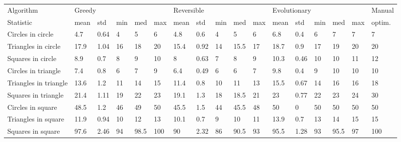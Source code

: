 \begin{tabular}{lllllllllllllllll}
\toprule
Algorithm & \multicolumn{5}{l}{Greedy} & \multicolumn{5}{l}{Reversible} & \multicolumn{5}{l}{Evolutionary} & Manual \\
Statistic &   mean &   std & min &   med &  max &       mean &   std & min &   med & max &         mean &   std & min &   med & max & optim. \\
\midrule
Circles in circle     &    4.7 &  0.64 &   4 &     5 &    6 &        4.8 &   0.6 &   4 &     5 &   6 &          6.8 &   0.4 &   6 &     7 &   7 &      7 \\
Triangles in circle   &   17.9 &  1.04 &  16 &    18 &   20 &       15.4 &  0.92 &  14 &  15.5 &  17 &         18.7 &   0.9 &  17 &    19 &  20 &     20 \\
Squares in circle     &    8.9 &   0.7 &   8 &     9 &   10 &          8 &  0.63 &   7 &     8 &   9 &         10.3 &  0.46 &  10 &    10 &  11 &     12 \\
Circles in triangle   &    7.4 &   0.8 &   6 &     7 &    9 &        6.4 &  0.49 &   6 &     6 &   7 &          9.8 &   0.4 &   9 &    10 &  10 &     10 \\
Triangles in triangle &   13.6 &   1.2 &  11 &    14 &   15 &       11.4 &   0.8 &  10 &    11 &  13 &         15.5 &  0.67 &  14 &    16 &  16 &     18 \\
Squares in triangle   &   21.4 &  1.11 &  19 &    22 &   23 &       19.1 &   1.3 &  18 &  18.5 &  21 &           23 &  0.77 &  22 &    23 &  24 &     30 \\
Circles in square     &   48.5 &   1.2 &  46 &    49 &   50 &       45.5 &   1.5 &  44 &  45.5 &  48 &           50 &     0 &  50 &    50 &  50 &     50 \\
Triangles in square   &   11.9 &  0.94 &  10 &    12 &   13 &       10.1 &   0.7 &   9 &    10 &  11 &         13.9 &   0.7 &  13 &    14 &  15 &     15 \\
Squares in square     &   97.6 &  2.46 &  94 &  98.5 &  100 &         90 &  2.32 &  86 &  90.5 &  93 &         95.5 &  1.28 &  93 &  95.5 &  97 &    100 \\
\bottomrule
\end{tabular}
